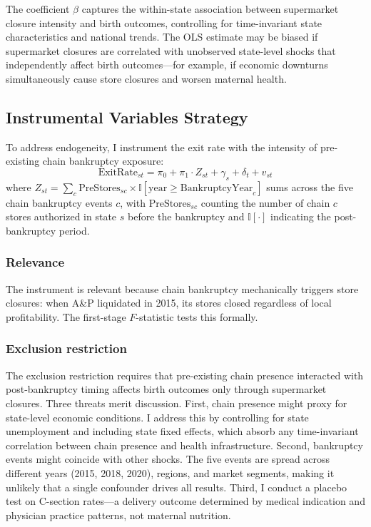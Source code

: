 \documentclass[12pt]{article}
\newcommand{\ind}{\mathbb{I}}
\begin{document}
The coefficient $\beta$ captures the within-state association between supermarket closure intensity and birth outcomes, controlling for time-invariant state characteristics and national trends. The OLS estimate may be biased if supermarket closures are correlated with unobserved state-level shocks that independently affect birth outcomes---for example, if economic downturns simultaneously cause store closures and worsen maternal health.

\subsection{Instrumental Variables Strategy}

To address endogeneity, I instrument the exit rate with the intensity of pre-existing chain bankruptcy exposure:
\begin{equation}
\text{ExitRate}_{st} = \pi_0 + \pi_1 \cdot Z_{st} + \gamma_s + \delta_t + v_{st}
\label{eq:first_stage}
\end{equation}
where $Z_{st} = \sum_{c} \text{PreStores}_{sc} \times \ind[\text{year} \geq \text{BankruptcyYear}_c]$ sums across the five chain bankruptcy events $c$, with $\text{PreStores}_{sc}$ counting the number of chain $c$ stores authorized in state $s$ before the bankruptcy and $\ind[\cdot]$ indicating the post-bankruptcy period.

\subsubsection*{Relevance} The instrument is relevant because chain bankruptcy mechanically triggers store closures: when A\&P liquidated in 2015, its stores closed regardless of local profitability. The first-stage $F$-statistic tests this formally.

\subsubsection*{Exclusion restriction} The exclusion restriction requires that pre-existing chain presence interacted with post-bankruptcy timing affects birth outcomes only through supermarket closures. Three threats merit discussion. First, chain presence might proxy for state-level economic conditions. I address this by controlling for state unemployment and including state fixed effects, which absorb any time-invariant correlation between chain presence and health infrastructure. Second, bankruptcy events might coincide with other shocks. The five events are spread across different years (2015, 2018, 2020), regions, and market segments, making it unlikely that a single confounder drives all results. Third, I conduct a placebo test on C-section rates---a delivery outcome determined by medical indication and physician practice patterns, not maternal nutrition.
\end{document}
